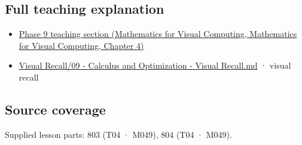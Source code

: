 \subsection{Full teaching explanation}\label{appendix-fecc1847f5a3-full-teaching-explanation}

\begin{itemize}
\tightlist
\item
  \href{../02-Mathematics-for-Visual-Computing/main.pdf\#nameddest=01-foundations-i-ch020-functions-limits-continuity-and-scalar-change}{Phase 9 teaching section (Mathematics for Visual Computing, Mathematics for Visual Computing, Chapter 4)}
\item
  \hyperref[appendix-adf48f5dc5c1]{Visual Recall/09 - Calculus and Optimization - Visual Recall.md} · visual recall
\end{itemize}

\subsection{Source coverage}\label{appendix-fecc1847f5a3-source-coverage}

Supplied lesson parts: 803 (T04 · M049), 804 (T04 · M049).
